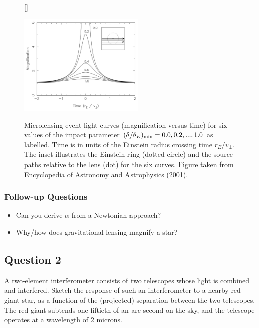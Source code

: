 \documentclass[a4paper,10pt]{article}
\begin{document}
\begin{figure}[t]
    [\FBwidth]
    {\caption{\footnotesize{Microlensing event light curves (magnification versus time) for six values of the impact parameter $(\delta/\theta_E)_{\rm min}=0.0,0.2,...,1.0$ as labelled. Time is in units of the Einstein radius crossing time $r_E/v_\perp$. The inset illustrates the Einstein ring (dotted circle) and the source paths relative to the lens (dot) for the six curves. Figure taken from Encyclopedia of Astronomy and Astrophysics (2001).}}
    \label{fig:microlensinglightcurve}}
    {\includegraphics[width=6cm]{figures/MicrolensingLightcurve.png}}
\end{figure}

\subsubsection{Follow-up Questions}

\begin{itemize}
    \item Can you derive $\alpha$ from a Newtonian approach?
    \item Why/how does gravitational lensing magnify a star?
\end{itemize}


\newpage
\subsection{Question 2}

A two-element interferometer consists of two telescopes whose light is combined and interfered. Sketch the response of such an interferometer to a nearby red giant star, as a function of the (projected) separation between the two telescopes. The red giant subtends one-fiftieth of an arc second on the sky, and the telescope operates at a wavelength of 2 microns.
\end{document}
